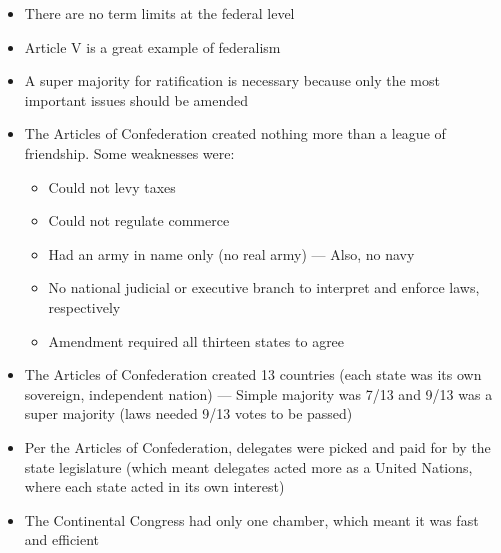 \documentclass[12pt]{article}
\begin{document}
\begin{itemize}
  \item There are no term limits at the federal level

  \item Article V is a great example of federalism

  \item A super majority for ratification is necessary because only the most important issues should be amended

  \item The Articles of Confederation created nothing more than a league of friendship. Some weaknesses were:

    \begin{itemize}
        
      \item Could not levy taxes

      \item Could not regulate commerce
        
      \item Had an army in name only (no real army) — Also, no navy

      \item No national judicial or executive branch to interpret and enforce laws, respectively

      \item Amendment required all thirteen states to agree

    \end{itemize}

  \item The Articles of Confederation created 13 countries (each state was its own sovereign, independent nation) — Simple majority was 7/13 and 9/13 was a super majority (laws needed 9/13 votes to be passed)

  \item Per the Articles of Confederation, delegates were picked and paid for by the state legislature (which meant delegates acted more as a United Nations, where each state acted in its own interest)

  \item The Continental Congress had only one chamber, which meant it was fast and efficient

\end{itemize}
\end{document}
